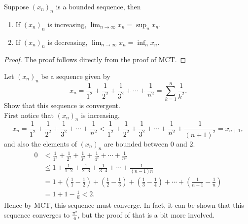 \documentclass[../real_analysis.tex]{subfiles}
\begin{document}
            \begin{corollary}
                Suppose $(x_n)_n$ is a bounded sequence, then
                \begin{enumerate}[label={\upshape(\roman*)}]
                    \item If $(x_n)_n$ is increasing, $\lim_{n\to\infty}x_n=\sup_n x_n$.
                    \item If $(x_n)_n$ is decreasing, $\lim_{n\to\infty}x_n=\inf_n x_n$.
                \end{enumerate}
            \end{corollary}
            \begin{proof}
                The proof follows directly from the proof of MCT.
            \end{proof}
            \begin{example}
                Let $(x_n)_n$ be a sequence given by
                \begin{equation}
                    x_n=\frac{1}{1^2}+\frac{1}{2^2}+\frac{1}{3^2}+\cdots+\frac{1}{n^2}=\sum_{k=1}^n\frac{1}{k^2}.
                \end{equation}
                Show that this sequence is convergent.\\
                First notice that $(x_n)_n$ is increasing,
                \begin{equation}
                    x_n=\frac{1}{1^2}+\frac{1}{2^2}+\frac{1}{3^2}+\cdots+\frac{1}{n^2}<\frac{1}{1^2}+\frac{1}{2^2}+\frac{1}{3^2}+\cdots+\frac{1}{n^2}+\frac{1}{(n+1)^2}=x_{n+1},
                \end{equation}
                and also the elements of $(x_n)_n$ are bounded between 0 and 2.
                \begin{align}
                    0&<\frac{1}{1^2}+\frac{1}{2^2}+\frac{1}{3^2}+\frac{1}{4^2}+\cdots+\frac{1}{n^2}\\
                    &\leq1+\frac{1}{1\cdot2}+\frac{1}{2\cdot3}+\frac{1}{3\cdot4}+\cdots+\frac{1}{(n-1)n}\\
                    &=1+\left(\frac{1}{1}-\frac{1}{2}\right)+\left(\frac{1}{2}-\frac{1}{3}\right)+\left(\frac{1}{3}-\frac{1}{4}\right)+\cdots+\left(\frac{1}{n-1}-\frac{1}{n}\right)\\
                    &=1+1-\frac{1}{n}<2.
                \end{align}
                Hence by MCT, this sequence must converge.
                In fact, it can be shown that this sequence converges to $\frac{\pi^2}{6}$, but the proof of that is a bit more involved.
            \end{example}
\end{document}
